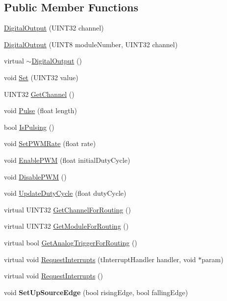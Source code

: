 \subsection*{Public Member Functions}
\begin{DoxyCompactItemize}
\item 
\hyperlink{classDigitalOutput_ac1c585e61a1a1ae2c79845063b596725}{DigitalOutput} (UINT32 channel)
\item 
\hyperlink{classDigitalOutput_a06417af5cc9ef34e2368dc2d4fb9e372}{DigitalOutput} (UINT8 moduleNumber, UINT32 channel)
\item 
virtual \hyperlink{classDigitalOutput_a442e379ebfbd2939d568809dad9c0ba2}{$\sim$DigitalOutput} ()
\item 
void \hyperlink{classDigitalOutput_af818325de1365e6b3902e64d7e902d72}{Set} (UINT32 value)
\item 
UINT32 \hyperlink{classDigitalOutput_a96c2d7c066de133bc4353251ddbbebf5}{GetChannel} ()
\item 
void \hyperlink{classDigitalOutput_a02c70b0de12b60f4d931cdc59e5e3bed}{Pulse} (float length)
\item 
bool \hyperlink{classDigitalOutput_ae7eeb94537b4b75891c9b93f380cc60d}{IsPulsing} ()
\item 
void \hyperlink{classDigitalOutput_ad02dd24082f2b19215ee3dba04e54cd9}{SetPWMRate} (float rate)
\item 
void \hyperlink{classDigitalOutput_a89d710e1c8968f956bafe63321728741}{EnablePWM} (float initialDutyCycle)
\item 
void \hyperlink{classDigitalOutput_aa50319d3ffed532b1adc2243e7d2cdea}{DisablePWM} ()
\item 
void \hyperlink{classDigitalOutput_a21ce143ed578be81d04d66c0f5ef1800}{UpdateDutyCycle} (float dutyCycle)
\item 
virtual UINT32 \hyperlink{classDigitalOutput_a51540582af4f1ebb04c19e0256e0cbfd}{GetChannelForRouting} ()
\item 
virtual UINT32 \hyperlink{classDigitalOutput_aa32b0d9370a8dca3970a09b38d0bb434}{GetModuleForRouting} ()
\item 
virtual bool \hyperlink{classDigitalOutput_a5385027e23524f1872c5a091a2b98501}{GetAnalogTriggerForRouting} ()
\item 
virtual void \hyperlink{classDigitalOutput_a7b6b75adbb177a08519ab3928f6ff625}{RequestInterrupts} (tInterruptHandler handler, void $\ast$param)
\item 
virtual void \hyperlink{classDigitalOutput_a8e0e5a3de7d43097e99f6ea885f43ece}{RequestInterrupts} ()
\item 
\hypertarget{classDigitalOutput_a1aeededcacfa0d99f29b72bfaed873f3}{
void {\bfseries SetUpSourceEdge} (bool risingEdge, bool fallingEdge)}
\label{classDigitalOutput_a1aeededcacfa0d99f29b72bfaed873f3}

\end{DoxyCompactItemize}


